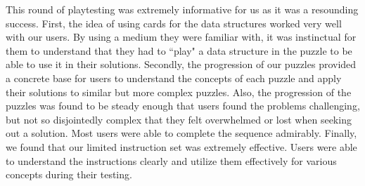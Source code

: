This round of playtesting was extremely informative for us as it was a resounding success. First, 
the idea of using cards for the data structures worked very well with our users. By using a 
medium they were familiar with, it was instinctual for them to understand that they had to 
``play" a data structure in the puzzle to be able to use it in their solutions. Secondly, the 
progression of our puzzles provided a concrete base for users to understand the concepts 
of each puzzle and apply their solutions to similar but more complex puzzles. Also, the progression 
of the puzzles was found to be steady enough that users found the problems challenging, but 
not so disjointedly complex that they felt overwhelmed or lost when seeking out a solution. 
Most users were able to complete the sequence admirably. Finally, we found that our limited 
instruction set was extremely effective. Users were able to understand the instructions clearly 
and utilize them effectively for various concepts during their testing.\\